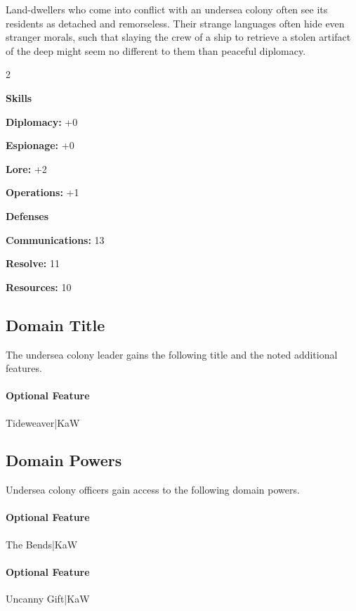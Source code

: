 \documentclass[10pt,a4paper,twoside,bg=print,twocolumn,openany,nodeprecatedcode]{dndbook}
\begin{document}
Land-dwellers who come into conflict with an undersea colony often see its residents as detached and remorseless. Their strange languages often hide even stranger morals, such that slaying the crew of a ship to retrieve a stolen artifact of the deep might seem no different to them than peaceful diplomacy.


\begin{itemize}
\begin{multicols}{2}
\item \textbf{Skills}
\item \textbf{Diplomacy:} +0
\item \textbf{Espionage:} +0
\item \textbf{Lore:} +2
\item \textbf{Operations:} +1
\item \textbf{Defenses}
\item \textbf{Communications:} 13
\item \textbf{Resolve:} 11
\item \textbf{Resources:} 10
\end{multicols}

\end{itemize}

\subsection{Domain Title}
The undersea colony leader gains the following title and the noted additional features.

\paragraph{Optional Feature}
Tideweaver|KaW

\subsection{Domain Powers}
Undersea colony officers gain access to the following domain powers.

\paragraph{Optional Feature}
The Bends|KaW

\paragraph{Optional Feature}
Uncanny Gift|KaW
\end{document}
